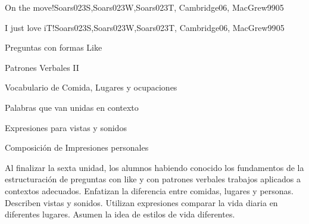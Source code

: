 \begin{syllabus}
\begin{unit}{On the move!}{Soars023S,Soars023W,Soars023T, Cambridge06, MacGrew99}{0}{5}
\end{unit}

\begin{unit}{I just love iT!}{Soars023S,Soars023W,Soars023T, Cambridge06, MacGrew99}{0}{5}
   \begin{topics}
      \item Preguntas con formas Like
      \item Patrones Verbales II
      \item Vocabulario de Comida, Lugares y ocupaciones
      \item Palabras que van unidas en contexto
      \item Expresiones para vistas y sonidos
      \item Composición de Impresiones personales
   \end{topics}

   \begin{unitgoals}
      \item Al finalizar la sexta unidad, los alumnos habiendo conocido los fundamentos de la estructuración de preguntas con like y con patrones verbales trabajos aplicados a contextos adecuados. Enfatizan la diferencia entre comidas, lugares y personas. Describen vistas y sonidos. Utilizan expresiones comparar la vida diaria en diferentes lugares. Asumen la idea de estilos de vida diferentes.
   \end{unitgoals}
\end{unit}



\begin{coursebibliography}
\end{coursebibliography}

\end{syllabus}
